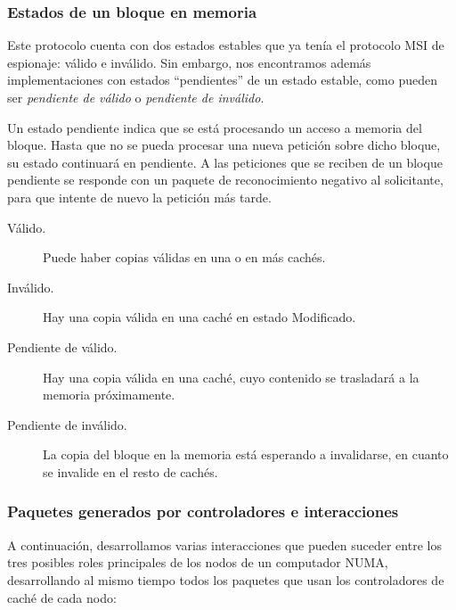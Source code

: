 \subsubsection{Estados de un bloque en memoria}
Este protocolo cuenta con dos estados estables que ya tenía el protocolo MSI de espionaje: válido e inválido. Sin embargo, nos encontramos además implementaciones con estados ``pendientes'' de un estado estable, como pueden ser \emph{pendiente de válido} o \emph{pendiente de inválido}. 

Un estado pendiente indica que se está procesando un acceso a memoria del bloque. Hasta que no se pueda procesar una nueva petición sobre dicho bloque, su estado continuará en pendiente. A las peticiones que se reciben de un bloque pendiente se responde con un paquete de reconocimiento negativo al solicitante, para que intente de nuevo la petición más tarde.
\begin{description}
    \item [Válido.] Puede haber copias válidas en una o en más cachés.
    \item [Inválido.] Hay una copia válida en una caché en estado Modificado.
    \item [Pendiente de válido.] Hay una copia válida en una caché, cuyo contenido se trasladará a la memoria próximamente.
    \item [Pendiente de inválido.] La copia del bloque en la memoria está esperando a invalidarse, en cuanto se invalide en el resto de cachés.
\end{description}

\subsubsection{Paquetes generados por controladores e interacciones}
A continuación, desarrollamos varias interacciones que pueden suceder entre los tres posibles roles principales de los nodos de un computador NUMA, desarrollando al mismo tiempo todos los paquetes que usan los controladores de caché de cada nodo:


